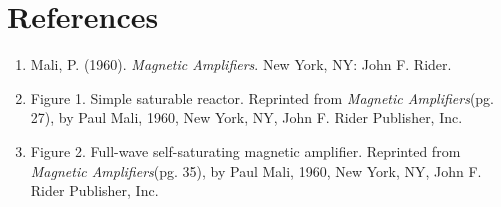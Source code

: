 \documentclass[11pt]{article}
\begin{document}
\pagebreak

\section{References}
\begin{enumerate}
\item Mali, P. (1960).\textit{ Magnetic Amplifiers}. New York, NY: John F. Rider.
\item Figure 1. Simple saturable reactor. Reprinted from \textit{Magnetic Amplifiers}(pg. 27), by Paul Mali, 1960, New York, NY, John F. Rider Publisher, Inc.
\item Figure 2. Full-wave self-saturating magnetic amplifier. Reprinted from \textit{Magnetic Amplifiers}(pg. 35), by Paul Mali, 1960, New York, NY, John F. Rider Publisher, Inc.
\end{enumerate}	
\end{document}
